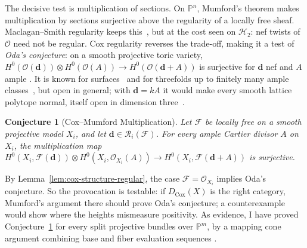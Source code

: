 \documentclass[11pt,reqno]{amsart}
\newtheorem{lemma}{Lemma}[section]
\newtheorem{conjecture}[lemma]{Conjecture}
\theoremstyle{remark}
\newcommand{\Cox}{\operatorname{Cox}}
\newcommand{\dd}{\mathbf{d}}
\newcommand{\PP}{\mathbb{P}}
\newcommand{\cF}{\mathcal{F}}
\newcommand{\cH}{\mathcal{H}}
\newcommand{\cO}{\mathcal{O}}
\newcommand{\cR}{\mathcal{R}}
\begin{document}
The decisive test is multiplication of sections. On $\PP^n$, Mumford's theorem makes multiplication by sections surjective above the regularity of a locally free sheaf. Maclagan--Smith regularity keeps this~\cite{maclaganSmith04}, but at the cost seen on $\cH_2$: nef twists of $\cO$ need not be regular. Cox regularity reverses the trade-off, making it a test of \emph{Oda's conjecture}: on a smooth projective toric variety, $H^0(\cO(\dd))\otimes H^0(\cO(A))\to H^0(\cO(\dd+A))$ is surjective for $\dd$ nef and $A$ ample \cite{oda08}. It is known for surfaces~\cite{fakhruddin03} and for threefolds up to finitely many ample classes~\cite{xin23}, but open in general; with $\dd=kA$ it would make every smooth lattice polytope normal, itself open in dimension three~\cite{BHHHJKM19}.

\begin{conjecture}[Cox--Mumford Multiplication]\label{conj:cox-multiplication}
Let $\cF$ be locally free on a smooth projective model $X_i$, and let $\dd\in\cR_i(\cF)$. For every ample Cartier divisor $A$ on $X_i$, the multiplication map $H^0(X_i,\cF(\dd))\otimes H^0(X_i,\cO_{X_i}(A))\to H^0(X_i,\cF(\dd+A))$ is surjective.
\end{conjecture}

By Lemma~\ref{lem:cox-structure-regular}, the case $\cF=\cO_{X_i}$  implies Oda's conjecture. So the provocation is testable: if $D_{\Cox}(X)$ is the right category, Mumford's argument there should prove Oda's conjecture; a counterexample would show where the heights mismeasure positivity. As evidence, I have proved Conjecture~\ref{conj:cox-multiplication} for every split projective bundles over $\mathbb{P}^m$, by a mapping cone argument combining base and fiber evaluation sequences \cite{malaspinaSankaran25}. 



\end{document}
